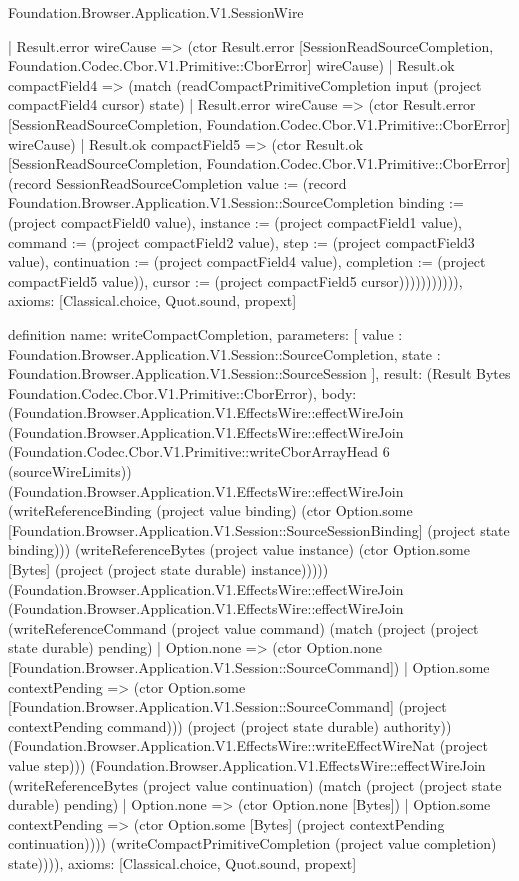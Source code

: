 \begin{lexlean}{Foundation.Browser.Application.V1.SessionWire}
\begin{semanticmodule}
{                | Result.error wireCause => (ctor Result.error [SessionReadSourceCompletion, Foundation.Codec.Cbor.V1.Primitive::CborError] wireCause)
                | Result.ok compactField4 => (match (readCompactPrimitiveCompletion input (project compactField4 cursor) state)
                  | Result.error wireCause => (ctor Result.error [SessionReadSourceCompletion, Foundation.Codec.Cbor.V1.Primitive::CborError] wireCause)
                  | Result.ok compactField5 => (ctor Result.ok [SessionReadSourceCompletion, Foundation.Codec.Cbor.V1.Primitive::CborError] (record SessionReadSourceCompletion {value := (record Foundation.Browser.Application.V1.Session::SourceCompletion {binding := (project compactField0 value), instance := (project compactField1 value), command := (project compactField2 value), step := (project compactField3 value), continuation := (project compactField4 value), completion := (project compactField5 value)}), cursor := (project compactField5 cursor)})))))))))),
  axioms: [Classical.choice, Quot.sound, propext]
}

definition{
  name: writeCompactCompletion,
  parameters: [
    value : Foundation.Browser.Application.V1.Session::SourceCompletion,
    state : Foundation.Browser.Application.V1.Session::SourceSession
  ],
  result: (Result Bytes Foundation.Codec.Cbor.V1.Primitive::CborError),
  body: (Foundation.Browser.Application.V1.EffectsWire::effectWireJoin (Foundation.Browser.Application.V1.EffectsWire::effectWireJoin (Foundation.Codec.Cbor.V1.Primitive::writeCborArrayHead 6 (sourceWireLimits)) (Foundation.Browser.Application.V1.EffectsWire::effectWireJoin (writeReferenceBinding (project value binding) (ctor Option.some [Foundation.Browser.Application.V1.Session::SourceSessionBinding] (project state binding))) (writeReferenceBytes (project value instance) (ctor Option.some [Bytes] (project (project state durable) instance))))) (Foundation.Browser.Application.V1.EffectsWire::effectWireJoin (Foundation.Browser.Application.V1.EffectsWire::effectWireJoin (writeReferenceCommand (project value command) (match (project (project state durable) pending)
    | Option.none => (ctor Option.none [Foundation.Browser.Application.V1.Session::SourceCommand])
    | Option.some contextPending => (ctor Option.some [Foundation.Browser.Application.V1.Session::SourceCommand] (project contextPending command))) (project (project state durable) authority)) (Foundation.Browser.Application.V1.EffectsWire::writeEffectWireNat (project value step))) (Foundation.Browser.Application.V1.EffectsWire::effectWireJoin (writeReferenceBytes (project value continuation) (match (project (project state durable) pending)
    | Option.none => (ctor Option.none [Bytes])
    | Option.some contextPending => (ctor Option.some [Bytes] (project contextPending continuation)))) (writeCompactPrimitiveCompletion (project value completion) state)))),
  axioms: [Classical.choice, Quot.sound, propext]
}


\end{semanticmodule}
\end{lexlean}
